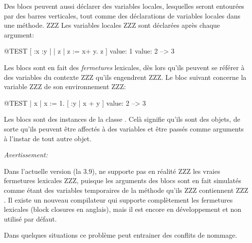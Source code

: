 \documentclass[a4paper,10pt,twoside]{book}
\begin{document}
Des blocs peuvent aussi d\'{e}clarer des variables locales, lesquelles seront entour\'{e}es par des barres verticales, tout comme des d\'{e}clarations de variables locales dans une m\'{e}thode.
ZZZ Les variables locales ZZZ sont d\'{e}clar\'{e}es apr\`{e}s chaque argument:

\begin{code}{@TEST}
[ :x :y | | z | z := x+ y. z ] value: 1 value: 2 --> 3
\end{code}

Les blocs sont en fait des \emph{fermetures} lexicales, d\`{e}s lors qu'ils peuvent se r\'{e}f\'{e}rer \`{a} des variables du contexte ZZZ qu'ils engendrent ZZZ.
Le bloc suivant concerne la variable  ZZZ de son environnement ZZZ:

\begin{code}{@TEST}
| x |
x := 1.
[ :y | x + y ] value: 2 --> 3
\end{code}

Les blocs sont des instances de la classe .
Cel\`{a} signifie qu'ils sont des objets, de sorte qu'ils peuvent \^{e}tre affect\'{e}s \`{a} des variables et \^{e}tre pass\'{e}s comme arguments \`{a} l'instar de tout autre objet.


\emph{Avertissement:}

Dans l'actuelle version (la 3.9), \sq ne supporte pas en r\'{e}alit\'{e} ZZZ les vraies fermetures lexicales ZZZ, puisque les arguments des blocs sont en fait simulat\'{e}s comme \'{e}tant des  variables temporaires de la m\'{e}thode qu'ils ZZZ contiennent ZZZ . Il existe un nouveau compilateur qui supporte compl\`{e}tement les fermetures lexicales (block closures en anglais), mais il est encore en d\'{e}veloppement et non utilis\'{e} par d\'{e}faut.

Dans quelques situations ce probl\`{e}me peut entrainer des conflits de nommage.
\end{document}
